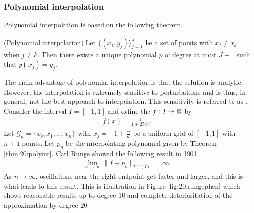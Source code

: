 \subsubsection{Polynomial interpolation}
Polynomial interpolation is based on the following theorem.
\begin{theorem}{(Polynomial interpolation)} \label{thm:20:polyint}
Let $\{(x_j,y_j)\}_{j=1}^{J}$ be a set of points with $x_j \neq x_k$ when $j \neq k$. Then there exists a unique polynomial $p$ of degree at most $J-1$ such that $p(x_j) = y_j$. 
\end{theorem}
The main advantage of polynomial interpolation is that the solution is analytic. However, the interpolation is extremely sensitive to perturbations and is thus, in general, not the best approach to interpolation. This sensitivity is referred to as . Consider the interval $I = [-1,1]$ and define the  $f : I \to \mathbb{R}$ by
\begin{align} \label{eqn:20:rungefnc}
f(x) = \frac{1}{1 + 25x^2}. 
\end{align}
Let $\mathcal{G}_{n} = \{x_0, x_1, ..., x_n\}$ with $x_j = -1 + \frac{2i}{n}$ be a uniform grid of $[-1,1]$ with $n+1$ points. Let $p_n$ be the interpolating polynomial given by Theorem \ref{thm:20:polyint}. Carl Runge showed the following result in 1901.
\begin{align} 
\lim_{n \to \infty} \|f - p_{n}\|_{L^{\infty}(I)} = \infty.
\end{align}
As $n \to \infty$, oscillations near the right endpoint get faster and larger, and this is what leads to this result. This is illustration in Figure \ref{fig:20:rungephen} which shows reasonable results up to degree $10$ and complete deterioritation of the approximation by degree $20$.
